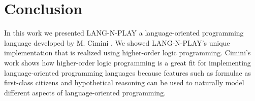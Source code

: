 
\section{Conclusion}
\label{conclusion}

In this work we presented LANG-N-PLAY a language-oriented programming language developed by M. Cimini \cite{cimini_languages_2018,cimini_lang-n-play_2018,cimini_effectiveness_2020}. We showed LANG-N-PLAY's unique implementation that is realized using higher-order logic programming. Cimini's work shows how higher-order logic programming is a great fit for implementing language-oriented programming languages because features such as formulae as first-class citizens and hypothetical reasoning can be used to naturally model different aspects of language-oriented programming.